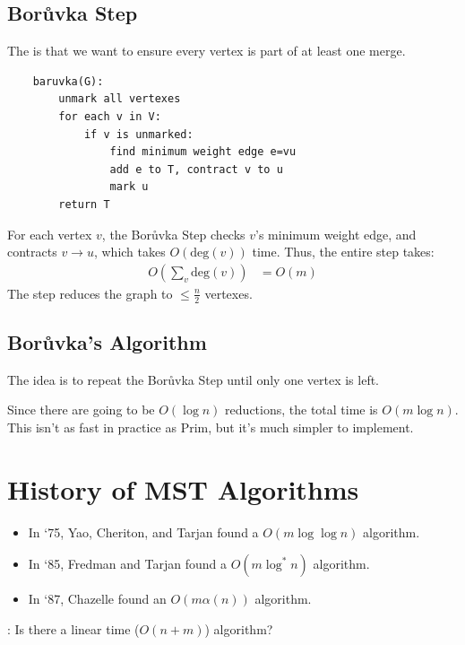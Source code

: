                 \subsection{Bor\r{u}vka Step} %
                \label{sub:baruvka_step}
                    The is that we want to ensure every vertex is part of at least one merge.
                    \begin{verbatim}
    baruvka(G):
        unmark all vertexes
        for each v in V:
            if v is unmarked:
                find minimum weight edge e=vu
                add e to T, contract v to u
                mark u
        return T
                    \end{verbatim}
                    For each vertex $v$, the Bor\r{u}vka Step checks $v$'s minimum weight edge, and contracts $v \to u$, which takes $O(\text{deg}(v))$ time.
                    Thus, the entire step takes:
                    \begin{align*}
                        O\left(\sum_v \text{deg}(v) \right) &= O(m)
                    \end{align*}
                    The step reduces the graph to $\le \frac{n}{2}$ vertexes.
                \subsection{Bor\r{u}vka's Algorithm} %
                \label{sub:baruvka_s_algorithm}
                    The idea is to repeat the Bor\r{u}vka Step until only one vertex is left.

                    Since there are going to be $O(\log n)$ reductions, the total time is $O(m \log n)$.
                    This isn't as fast in practice as Prim, but it's much simpler to implement.
            \section{History of MST Algorithms} %
            \label{sec:history_of_mst_algorithms}
                \begin{itemize}
                    \item In `75, Yao, Cheriton, and Tarjan found a $O(m \log \log n)$ algorithm.
                    \item In `85, Fredman and Tarjan found a $O(m \log^* n)$ algorithm.
                    \item In `87, Chazelle found an $O(m \alpha(n))$ algorithm.
                \end{itemize}
                \open: Is there a linear time ($O(n + m)$) algorithm?
